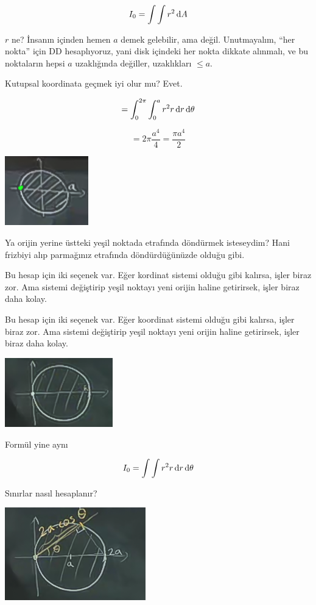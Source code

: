 \documentclass[12pt,fleqn]{article}\usepackage{../../common}
\begin{document}
$$ I_0 = \int \int r^2 \,\mathrm{d} A $$

$r$ ne? İnsanın içinden hemen $a$ demek gelebilir, ama değil. Unutmayalım, ``her
nokta'' için DD hesaplıyoruz, yani disk içindeki her nokta dikkate alınmalı, ve
bu noktaların hepsi $a$ uzaklığında değiller, uzaklıkları $\le a$.

Kutupsal koordinata geçmek iyi olur mu? Evet. 

$$ = \int_0^{2\pi} \int_0^a r^2 r \,\mathrm{d} r \,\mathrm{d}\theta $$

$$ = 2\pi \frac{a^4}{4} = \frac{\pi a^4}{2} $$

\begin{center}
\includegraphics[height=3cm]{17_8.png}
\end{center}

Ya orijin yerine üstteki yeşil noktada etrafında döndürmek isteseydim? Hani
frizbiyi alıp parmağınız etrafında döndürdüğünüzde olduğu gibi.

Bu hesap için iki seçenek var. Eğer kordinat sistemi olduğu gibi kalırsa, işler
biraz zor. Ama sistemi değiştirip yeşil noktayı yeni orijin haline getirirsek,
işler biraz daha kolay.

Bu hesap için iki seçenek var. Eğer koordinat sistemi olduğu gibi kalırsa,
işler biraz zor. Ama sistemi değiştirip yeşil noktayı yeni orijin haline
getirirsek, işler biraz daha kolay.

\begin{center}
\includegraphics[height=3cm]{17_9.png}
\end{center}

Formül yine aynı

$$ I_0 = \int \int r^2 r \,\mathrm{d} r \,\mathrm{d}\theta $$

Sınırlar nasıl hesaplanır? 

\begin{center}
\includegraphics[height=4cm]{17_10.png}
\end{center}
\end{document}
